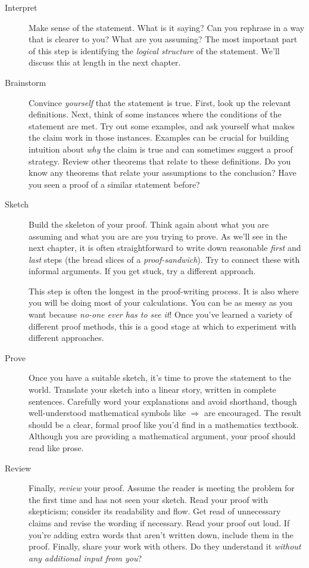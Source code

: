 \begin{description}
	\item[Interpret] Make sense of the statement. What is it saying? Can you rephrase in a way that is clearer to you? What are you assuming? The most important part of this step is identifying the \emph{logical structure} of the statement. We'll discuss this at length in the next chapter.
    
	\item[Brainstorm] Convince \emph{yourself} that the statement is true. First, look up the relevant definitions. Next, think of some instances where the conditions of the statement are met. Try out some examples, and ask yourself what makes the claim work in those instances. Examples can be crucial for building intuition about \emph{why} the claim is true and can sometimes suggest a proof strategy. Review other theorems that relate to these definitions. Do you know any theorems that relate your assumptions to the conclusion? Have you seen a proof of a similar statement before?

	\item[Sketch] Build the skeleton of your proof. Think again about what you are assuming and what you are are you trying to prove. As we'll see in the next chapter, it is often straightforward to write down reasonable \emph{first} and \emph{last} steps (the bread slices of a \emph{proof-sandwich}). Try to connect these with informal arguments. If you get stuck, try a different approach.\par
	This step is often the longest in the proof-writing process. It is also where you will be doing most of your calculations. You can be as messy as you want because \emph{no-one ever has to see it}! Once you've learned a variety of different proof methods, this is a good stage at which to experiment with different approaches.
  
	\item[Prove] Once you have a suitable sketch, it's time to prove the statement to the world. Translate your sketch into a linear story, written in complete sentences. Carefully word your explanations and avoid shorthand, though well-understood mathematical symbols like $\Longrightarrow$ are encouraged. The result should be a clear, formal proof like you'd find in a mathematics textbook. Although you are providing a mathematical argument, your proof should read like prose. 

	\item[Review] Finally, \emph{review} your proof. Assume the reader is meeting the problem for the first time and has not seen your sketch. Read your proof with skepticism; consider its readability and flow. Get read of unnecessary claims and revise the wording if necessary. Read your proof out loud. If you're adding extra words that aren't written down, include them in the proof. Finally, share your work with others. Do they understand it \emph{without any additional input from you}?
\end{description}

